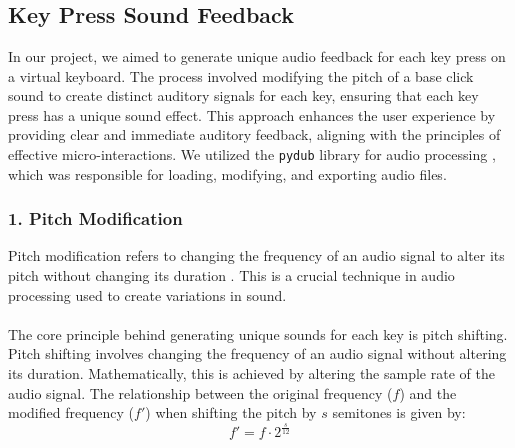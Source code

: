 \noindent
\\\\                
\noindent
\\\\  \noindent
\\\\  \noindent
\\\\  \noindent

\subsection{Key Press Sound Feedback} 

In our project, we aimed to generate unique audio feedback for each key press on a virtual keyboard. The process involved modifying the pitch of a base click sound to create distinct auditory signals for each key, ensuring that each key press has a unique sound effect. This approach enhances the user experience by providing clear and immediate auditory feedback, aligning with the principles of effective micro-interactions. We utilized the \texttt{pydub} library for audio processing \cite{pydub}, which was responsible for loading, modifying, and exporting audio files.

\subsubsection*{1. Pitch Modification}

Pitch modification refers to changing the frequency of an audio signal to alter its pitch without changing its duration \cite{smith1999}. This is a crucial technique in audio processing used to create variations in sound.\\ \\
\noindent
The core principle behind generating unique sounds for each key is pitch shifting. Pitch shifting involves changing the frequency of an audio signal without altering its duration. Mathematically, this is achieved by altering the sample rate of the audio signal.
The relationship between the original frequency (\( f \)) and the modified frequency (\( f' \)) when shifting the pitch by \( s \) semitones is given by:
\begin{equation}
f' = f \cdot 2^{\frac{s}{12}}
\end{equation}


